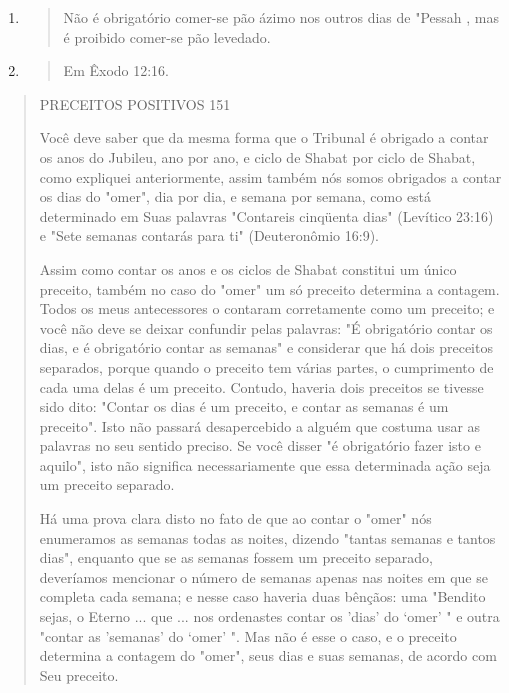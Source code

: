 \begin{enumerate}
\def\labelenumi{\arabic{enumi}.}
\setcounter{enumi}{182}
\item
  \begin{quote}
  Não é obrigatório comer-se pão ázimo nos outros dias de "Pessah , mas
  é proibido comer-se pão levedado.
  \end{quote}
\item
  \begin{quote}
  Em Êxodo 12:16.
  \end{quote}
\end{enumerate}

\begin{quote}
PRECEITOS POSITIVOS 151

Você deve saber que da mesma forma que o Tribunal é obrigado a contar os
anos do Jubileu, ano por ano, e ciclo de Shabat por ciclo de Shabat,
como expliquei anteriormente, assim também nós somos obrigados a contar
os dias do "omer", dia por dia, e semana por semana, como está
determinado em Suas palavras "Contareis cinqüenta dias" (Levítico 23:16)
e "Sete semanas contarás para ti" (Deuteronômio 16:9).

Assim como contar os anos e os ciclos de Shabat constitui um único
preceito, também no caso do "omer" um só preceito determina a contagem.
Todos os meus antecessores o contaram corretamente como um preceito; e
você não deve se deixar confundir pelas palavras: "É obrigatório contar
os dias, e é obrigatório contar as semanas" e considerar que há dois
preceitos separados, porque quando o preceito tem várias partes, o
cumprimento de cada uma delas é um preceito. Contudo, haveria dois
preceitos se tivesse sido dito: "Contar os dias é um preceito, e contar
as semanas é um preceito". Isto não passará desapercebido a alguém que
costuma usar as palavras no seu sentido preciso. Se você disser "é
obrigatório fazer isto e aquilo", isto não significa necessaria­mente
que essa determinada ação seja um preceito separado.

Há uma prova clara disto no fato de que ao contar o "omer" nós
enumeramos as semanas todas as noites, dizendo "tantas semanas e tantos
dias", enquanto que se as semanas fossem um preceito separado,
deveríamos men­cionar o número de semanas apenas nas noites em que se
completa cada sema­na; e nesse caso haveria duas bênçãos: uma "Bendito
sejas, o Eterno ... que ... nos ordenastes contar os 'dias' do `omer' "
e outra "contar as 'semanas' do `omer' ". Mas não é esse o caso, e o
preceito determina a contagem do "omer", seus dias e suas semanas, de
acordo com Seu preceito.


\end{quote}
